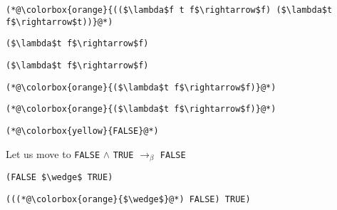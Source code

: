 \documentclass{beamer}
\begin{document}
\begin{frame}[fragile]{\CurrentSection}
\lstset{basicstyle=\ttfamily\small}\lstset{numbers=none}\lstset{language=ML}\begin{lstlisting}
(*@\colorbox{orange}{(($\lambda$f t f$\rightarrow$f) ($\lambda$t f$\rightarrow$t))}@*)
\end{lstlisting}
\pause\lstset{language=ML}\begin{lstlisting}
($\lambda$t f$\rightarrow$f)
\end{lstlisting}

\end{frame}

\begin{frame}[fragile]{\CurrentSection}
\lstset{basicstyle=\ttfamily\small}\lstset{numbers=none}\lstset{language=ML}\begin{lstlisting}
($\lambda$t f$\rightarrow$f)
\end{lstlisting}
\pause\lstset{language=ML}\begin{lstlisting}
(*@\colorbox{orange}{($\lambda$t f$\rightarrow$f)}@*)
\end{lstlisting}

\end{frame}

\begin{frame}[fragile]{\CurrentSection}
\lstset{basicstyle=\ttfamily\small}\lstset{numbers=none}\lstset{language=ML}\begin{lstlisting}
(*@\colorbox{orange}{($\lambda$t f$\rightarrow$f)}@*)
\end{lstlisting}
\pause\lstset{language=ML}\begin{lstlisting}
(*@\colorbox{yellow}{FALSE}@*)
\end{lstlisting}

\end{frame}

\begin{frame}[fragile]{\CurrentSection}
\begin{block}{\CurrentSubSection}
Let us move to \texttt{FALSE} $\wedge$ \texttt{TRUE} $\rightarrow_\beta$ \texttt{FALSE}
\end{block}


\end{frame}

\begin{frame}[fragile]{\CurrentSection}
\lstset{basicstyle=\ttfamily\small}\lstset{numbers=none}\lstset{language=ML}\begin{lstlisting}
(FALSE $\wedge$ TRUE)
\end{lstlisting}
\pause\lstset{language=ML}\begin{lstlisting}
(((*@\colorbox{orange}{$\wedge$}@*) FALSE) TRUE)
\end{lstlisting}

\end{frame}
\end{document}
